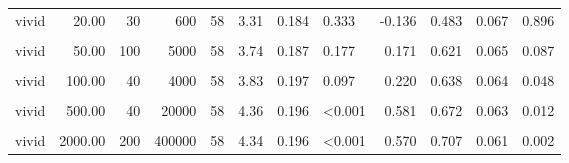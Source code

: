 \documentclass[
]{article}
\begin{document}
\begin{longtable}[t]{lrrrrrrlrrrl}
\hspace{1em}vivid & 20.00 & 30 & 600 & 58 & 3.31 & 0.184 & 0.333 & -0.136 & 0.483 & 0.067 & 0.896\\
\hspace{1em}\cellcolor{gray!10}{vivid} & \cellcolor{gray!10}{50.00} & \cellcolor{gray!10}{10} & \cellcolor{gray!10}{500} & \cellcolor{gray!10}{58} & \cellcolor{gray!10}{3.95} & \cellcolor{gray!10}{0.202} & \cellcolor{gray!10}{0.030} & \cellcolor{gray!10}{0.294} & \cellcolor{gray!10}{0.707} & \cellcolor{gray!10}{0.061} & \cellcolor{gray!10}{0.002}\\
\hspace{1em}vivid & 50.00 & 100 & 5000 & 58 & 3.74 & 0.187 & 0.177 & 0.171 & 0.621 & 0.065 & 0.087\\
\hspace{1em}\cellcolor{gray!10}{vivid} & \cellcolor{gray!10}{100.00} & \cellcolor{gray!10}{30} & \cellcolor{gray!10}{3000} & \cellcolor{gray!10}{58} & \cellcolor{gray!10}{4.05} & \cellcolor{gray!10}{0.196} & \cellcolor{gray!10}{0.006} & \cellcolor{gray!10}{0.373} & \cellcolor{gray!10}{0.707} & \cellcolor{gray!10}{0.061} & \cellcolor{gray!10}{0.002}\\
\hspace{1em}vivid & 100.00 & 40 & 4000 & 58 & 3.83 & 0.197 & 0.097 & 0.220 & 0.638 & 0.064 & 0.048\\
\hspace{1em}\cellcolor{gray!10}{vivid} & \cellcolor{gray!10}{500.00} & \cellcolor{gray!10}{10} & \cellcolor{gray!10}{5000} & \cellcolor{gray!10}{58} & \cellcolor{gray!10}{4.14} & \cellcolor{gray!10}{0.198} & \cellcolor{gray!10}{0.003} & \cellcolor{gray!10}{0.428} & \cellcolor{gray!10}{0.724} & \cellcolor{gray!10}{0.060} & \cellcolor{gray!10}{<0.001}\\
\hspace{1em}vivid & 500.00 & 40 & 20000 & 58 & 4.36 & 0.196 & <0.001 & 0.581 & 0.672 & 0.063 & 0.012\\
\hspace{1em}\cellcolor{gray!10}{vivid} & \cellcolor{gray!10}{2000.00} & \cellcolor{gray!10}{20} & \cellcolor{gray!10}{40000} & \cellcolor{gray!10}{58} & \cellcolor{gray!10}{4.57} & \cellcolor{gray!10}{0.184} & \cellcolor{gray!10}{<0.001} & \cellcolor{gray!10}{0.769} & \cellcolor{gray!10}{0.810} & \cellcolor{gray!10}{0.052} & \cellcolor{gray!10}{<0.001}\\
\hspace{1em}vivid & 2000.00 & 200 & 400000 & 58 & 4.34 & 0.196 & <0.001 & 0.570 & 0.707 & 0.061 & 0.002\\

\end{longtable}
\end{document}

